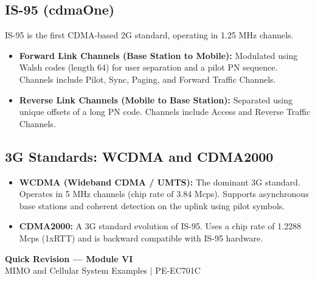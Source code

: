 \documentclass[12pt,a4paper]{article}
\begin{document}
\subsection{IS-95 (cdmaOne)}
IS-95 is the first CDMA-based 2G standard, operating in 1.25 MHz channels.
\begin{itemize}[leftmargin=*, itemsep=3pt]
  \item \textbf{Forward Link Channels (Base Station to Mobile):} Modulated using Walsh codes (length 64) for user separation and a pilot PN sequence. Channels include Pilot, Sync, Paging, and Forward Traffic Channels.
  \item \textbf{Reverse Link Channels (Mobile to Base Station):} Separated using unique offsets of a long PN code. Channels include Access and Reverse Traffic Channels.
\end{itemize}

\subsection{3G Standards: WCDMA and CDMA2000}
\begin{itemize}[leftmargin=*, itemsep=3pt]
  \item \textbf{WCDMA (Wideband CDMA / UMTS):} The dominant 3G standard. Operates in 5 MHz channels (chip rate of 3.84 Mcps). Supports asynchronous base stations and coherent detection on the uplink using pilot symbols.
  \item \textbf{CDMA2000:} A 3G standard evolution of IS-95. Uses a chip rate of 1.2288 Mcps (1xRTT) and is backward compatible with IS-95 hardware.
\end{itemize}

\newpage
\begin{center}
  {\large\bfseries\color{myred} Quick Revision --- Module VI}\\[3pt]
  {\small\color{mydark} MIMO and Cellular System Examples $|$ PE-EC701C}
\end{center}
\noindent{\color{myred}\rule{\linewidth}{1.2pt}}
\vspace{4pt}
\end{document}
